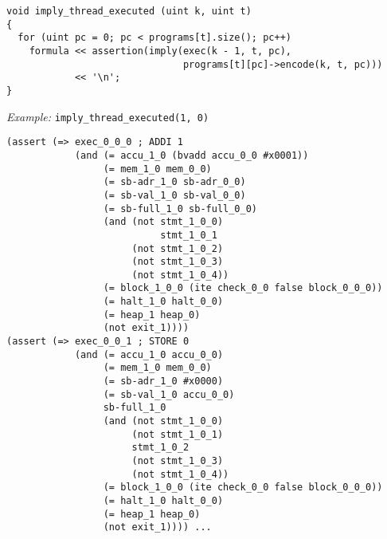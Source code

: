 \begin{lstlisting}[style=c++]
void imply_thread_executed (uint k, uint t)
{
  for (uint pc = 0; pc < programs[t].size(); pc++)
    formula << assertion(imply(exec(k - 1, t, pc),
                               programs[t][pc]->encode(k, t, pc)))
            << '\n';
}
\end{lstlisting}

\noindent
\emph{Example:} \lstinline[style=c++]{imply_thread_executed(1, 0)}

\begin{lstlisting}[language=SMTLib]
(assert (=> exec_0_0_0 ; ADDI 1
            (and (= accu_1_0 (bvadd accu_0_0 #x0001))
                 (= mem_1_0 mem_0_0)
                 (= sb-adr_1_0 sb-adr_0_0)
                 (= sb-val_1_0 sb-val_0_0)
                 (= sb-full_1_0 sb-full_0_0)
                 (and (not stmt_1_0_0)
                           stmt_1_0_1
                      (not stmt_1_0_2)
                      (not stmt_1_0_3)
                      (not stmt_1_0_4))
                 (= block_1_0_0 (ite check_0_0 false block_0_0_0))
                 (= halt_1_0 halt_0_0)
                 (= heap_1 heap_0)
                 (not exit_1))))
(assert (=> exec_0_0_1 ; STORE 0
            (and (= accu_1_0 accu_0_0)
                 (= mem_1_0 mem_0_0)
                 (= sb-adr_1_0 #x0000)
                 (= sb-val_1_0 accu_0_0)
                 sb-full_1_0
                 (and (not stmt_1_0_0)
                      (not stmt_1_0_1)
                      stmt_1_0_2
                      (not stmt_1_0_3)
                      (not stmt_1_0_4))
                 (= block_1_0_0 (ite check_0_0 false block_0_0_0))
                 (= halt_1_0 halt_0_0)
                 (= heap_1 heap_0)
                 (not exit_1)))) ...
\end{lstlisting}


